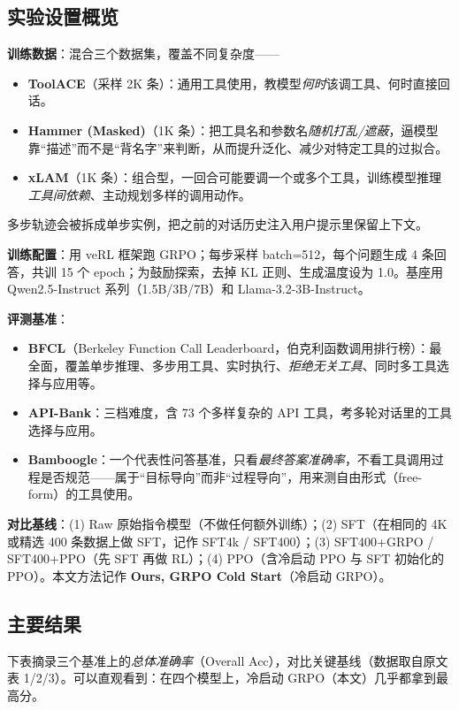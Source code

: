 \documentclass[11pt,UTF8,fontset=fandol]{ctexart}
\begin{document}
\subsection{实验设置概览}

\textbf{训练数据}：混合三个数据集，覆盖不同复杂度——
\begin{itemize}[leftmargin=1.5em]
\item \textbf{ToolACE}（采样 2K 条）：通用工具使用，教模型\emph{何时}该调工具、何时直接回话。
\item \textbf{Hammer (Masked)}（1K 条）：把工具名和参数名\emph{随机打乱/遮蔽}，逼模型靠“描述”而不是“背名字”来判断，从而提升泛化、减少对特定工具的过拟合。
\item \textbf{xLAM}（1K 条）：组合型，一回合可能要调一个或多个工具，训练模型推理\emph{工具间依赖}、主动规划多样的调用动作。
\end{itemize}
多步轨迹会被拆成单步实例，把之前的对话历史注入用户提示里保留上下文。

\textbf{训练配置}：用 veRL 框架跑 GRPO；每步采样 batch=512，每个问题生成 4 条回答，共训 15 个 epoch；为鼓励探索，去掉 KL 正则、生成温度设为 1.0。基座用 Qwen2.5-Instruct 系列（1.5B/3B/7B）和 Llama-3.2-3B-Instruct。

\textbf{评测基准}：
\begin{itemize}[leftmargin=1.5em]
\item \textbf{BFCL}（Berkeley Function Call Leaderboard，伯克利函数调用排行榜）：最全面，覆盖单步推理、多步用工具、实时执行、\emph{拒绝无关工具}、同时多工具选择与应用等。
\item \textbf{API-Bank}：三档难度，含 73 个多样复杂的 API 工具，考多轮对话里的工具选择与应用。
\item \textbf{Bamboogle}：一个代表性问答基准，只看\emph{最终答案准确率}，不看工具调用过程是否规范——属于“目标导向”而非“过程导向”，用来测自由形式（free-form）的工具使用。
\end{itemize}

\textbf{对比基线}：(1) Raw 原始指令模型（不做任何额外训练）；(2) SFT（在相同的 4K 或精选 400 条数据上做 SFT，记作 SFT4k / SFT400）；(3) SFT400+GRPO / SFT400+PPO（先 SFT 再做 RL）；(4) PPO（含冷启动 PPO 与 SFT 初始化的 PPO）。本文方法记作 \textbf{Ours, GRPO Cold Start}（冷启动 GRPO）。

\subsection{主要结果}

下表摘录三个基准上的\emph{总体准确率}（Overall Acc），对比关键基线（数据取自原文表 1/2/3）。可以直观看到：在四个模型上，冷启动 GRPO（本文）几乎都拿到最高分。
\end{document}
